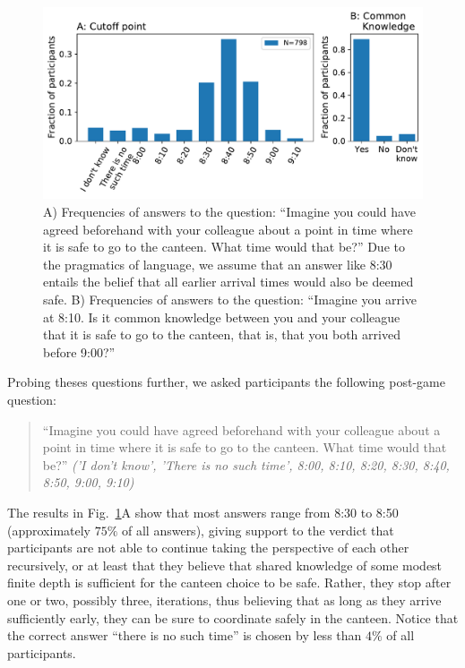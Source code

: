 \documentclass[twocolumn,a4paper,superscriptaddress,nofootinbib]{revtex4}
\begin{document}
\begin{figure} %
\centering\includegraphics[width=1\linewidth]{fig6_cutoff}
\caption{A) Frequencies of answers to the question: ``Imagine you could have agreed beforehand with your colleague about a point in time where it is safe to go to the canteen. What time would that be?'' Due to the pragmatics of language, we assume that an answer like 8:30 entails the belief that all earlier arrival times would also be deemed safe. B) Frequencies of answers to the question: ``Imagine you arrive at 8:10. Is it common knowledge between you and your colleague that it is safe to go to the canteen, that is, that you both arrived before 9:00?''}
\label{fig:5} %
\end{figure}
Probing theses questions further, we asked participants the following post-game question:
\begin{quote}
\indent
``Imagine you could have agreed beforehand with your colleague about a point in time where it is safe to go to the canteen. What time would that be?'' \textit{('I don't know', 'There is no such time', 8:00, 8:10, 8:20, 8:30, 8:40, 8:50, 9:00, 9:10)}
\end{quote}
The results in Fig.~\ref{fig:5}A show that most answers range from 8:30 to 8:50 (approximately $75\%$ of all answers), giving support to the verdict that participants are not able to continue taking the perspective of each other recursively, or at least that they believe that shared knowledge of some modest finite depth is sufficient for the canteen choice to be safe. Rather, they stop after one or two, possibly three, iterations, thus believing that as long as they arrive sufficiently early, they can be sure to coordinate safely in the canteen. Notice that the correct answer ``there is no such time'' is chosen by less than $4\%$ of all participants. 
\end{document}

